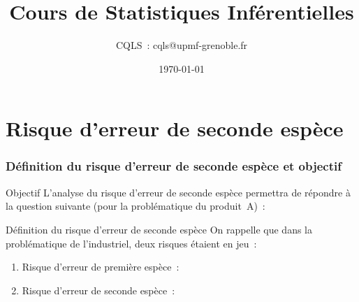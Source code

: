 \documentclass[11pt]{beamer}
\title[Problématiques Produits A et B]
{Cours de Statistiques Inférentielles}
\author{CQLS~: cqls@upmf-grenoble.fr}
\date{\today}
\begin{document}
\maketitle


\section{Risque d'erreur de seconde espèce}

\begin{frame}
\frametitle{Définition du risque d'erreur de seconde espèce et objectif}


\begin{exampleblock}{Objectif}
L'analyse du risque d'erreur de seconde espèce permettra de répondre à la question suivante (pour la problématique du produit~A)~: \\ \pause
\begin{center}\color{red}{Avant le jour~J, l'industriel  a-t-il intérêt \\à acheter le jeu de données~?} \pause
\end{center}
\end{exampleblock}

\begin{exampleblock}{Définition du risque d'erreur de seconde espèce}
On rappelle que dans la problématique de l'industriel, deux risques étaient en jeu~: \pause
\begin{enumerate}
\item {\small Risque d'erreur de première espèce~:} \pause
\item {\small Risque d'erreur de seconde espèce~:} 
\end{enumerate}
\end{exampleblock}
\end{frame}
\end{document}
